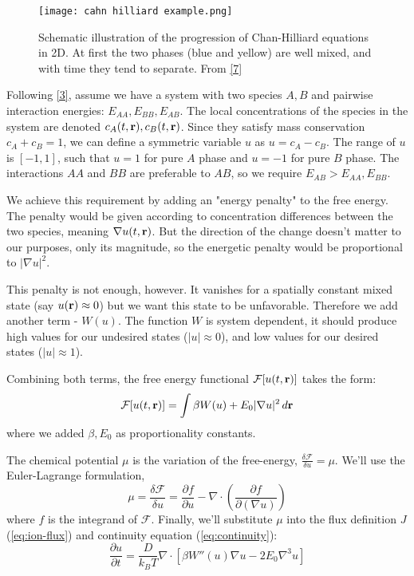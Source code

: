 \documentclass[12pt]{article}
\begin{document}
\begin{figure}[h!] 
	\centering 
	\texttt{[image: cahn hilliard example.png]}
	\caption{Schematic illustration of the progression of Chan-Hilliard equations in 2D. At first the two phases (blue and yellow) are well mixed, and with time they tend to separate. From \hyperref[c:7]{[7]}} \label{fig:cahn-hilliard}
\end{figure}

Following \hyperref[c:3]{[3]}, assume we have a system with two species $A, B$ and pairwise interaction energies: $E_{AA}, E_{BB}, E_{AB}$. The local concentrations of the species in the system are denoted $c_A(t, {\bf r}), c_B(t, {\bf r})$. Since they satisfy mass conservation $c_A + c_B = 1$, we can define a symmetric variable $u$ as $u = c_A - c_B$. The range of $u$ is $[-1,1]$, such that $u=1$ for pure $A$ phase and $u=-1$ for pure $B$ phase. The interactions $AA$ and $BB$ are preferable to $AB$, so we require $E_{AB} > E_{AA}, E_{BB}$.

We achieve this requirement by adding an "energy penalty" to the free energy. The penalty would be given according to concentration differences between the two species, meaning $\nabla u(t, {\bf r})$. But the direction of the change doesn't matter to our purposes, only its magnitude, so the energetic penalty would be proportional to $|\nabla u|^2$. 

This penalty is not enough, however. It vanishes for a spatially constant mixed state (say $u({\bf r}) \approx 0$) but we want this state to be unfavorable. Therefore we add another term - $W(u)$. The function $W$ is system dependent, it should produce high values for our undesired states ($|u| \approx 0$), and low values for our desired states ($|u| \approx 1$).

Combining both terms, the free energy functional $\mathcal{F}[u(t, {\bf r})]$ takes the form:
\begin{equation}
    \mathcal{F}[u(t, {\bf r})] = \int \beta W(u) + E_0 |\nabla u|^2 \, d{\bf r}
\end{equation}
where we added $\beta, E_0$ as proportionality constants.

The chemical potential $\mu$ is the variation of the free-energy, $\frac{\delta \mathcal{F}}{\delta u} = \mu$. We'll use the Euler-Lagrange formulation,
\begin{equation}
   \mu = \frac{\delta \mathcal{F}}{\delta u} = \frac{\partial f}{\partial u} - \nabla \cdot \left(\frac{\partial f}{\partial (\nabla u)}\right)
\end{equation}
where $f$ is the integrand of $\mathcal{F}$.
Finally, we'll substitute $\mu$ into the flux definition $J$ (\ref{eq:ion-flux}) and continuity equation (\ref{eq:continuity}):
\begin{equation} \label{eq:cahn-hilliard}
    \frac{\partial u}{\partial t} = \frac{D}{k_B T} \nabla \cdot \left[  \beta W''(u) \nabla u - 2E_0 \nabla ^3 u \right]
\end{equation}
\end{document}
